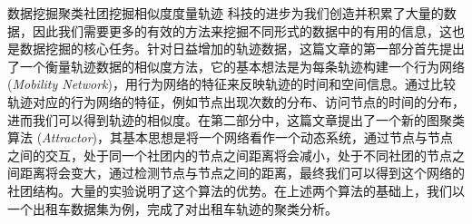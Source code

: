 
\begin{Cabstract}{数据挖掘}{聚类}{社团挖掘}{相似度度量}{轨迹}
科技的进步为我们创造并积累了大量的数据，因此我们需要更多的有效的方法来挖掘不同形式的数据中的有用的信息，这也是数据挖掘的核心任务。针对日益增加的轨迹数据，这篇文章的第一部分首先提出了一个衡量轨迹数据的相似度方法，它的基本想法是为每条轨迹构建一个行为网络 (\emph{Mobility Network})，用行为网络的特征来反映轨迹的时间和空间信息。通过比较轨迹对应的行为网络的特征，例如节点出现次数的分布、访问节点的时间的分布，进而我们可以得到轨迹的相似度。在第二部分中，这篇文章提出了一个新的图聚类算法 (\emph{Attractor})，其基本思想是将一个网络看作一个动态系统，通过节点与节点之间的交互，处于同一个社团内的节点之间距离将会减小，处于不同社团的节点之间距离将会变大，通过检测节点与节点之间的距离，最终我们可以得到这个网络的社团结构。大量的实验说明了这个算法的优势。在上述两个算法的基础上，我们以一个出租车数据集为例，完成了对出租车轨迹的聚类分析。
\end{Cabstract}




